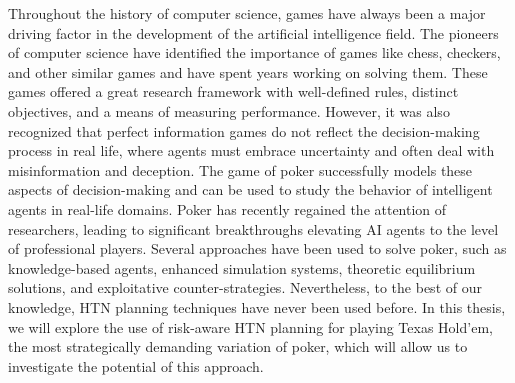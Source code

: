 Throughout the history of computer science, games have always been a major driving factor in the development of the artificial intelligence field. The pioneers of computer science have identified the importance of games like chess, checkers, and other similar games and have spent years working on solving them. These games offered a great research framework with well-defined rules, distinct objectives, and a means of measuring performance. However, it was also recognized that perfect information games do not reflect the decision-making process in real life, where agents must embrace uncertainty and often deal with misinformation and deception. The game of poker successfully models these aspects of decision-making and can be used to study the behavior of intelligent agents in real-life domains. Poker has recently regained the attention of researchers, leading to significant breakthroughs elevating AI agents to the level of professional players. Several approaches have been used to solve poker, such as knowledge-based agents, enhanced simulation systems, theoretic equilibrium solutions, and exploitative counter-strategies. Nevertheless, to the best of our knowledge, HTN planning techniques have never been used before. In this thesis, we will explore the use of risk-aware HTN planning for playing Texas Hold'em, the most strategically demanding variation of poker, which will allow us to investigate the potential of this approach.
